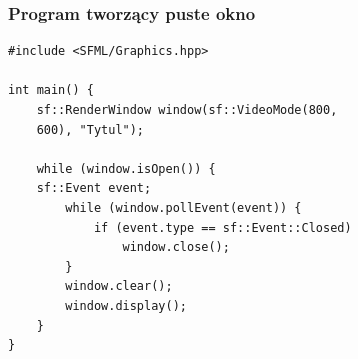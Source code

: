 \documentclass[12pt]{beamer}
\begin{document}
    \begin{frame}[fragile]
        \frametitle{Program tworzący puste okno}
        \begin{lstlisting}         
#include <SFML/Graphics.hpp>
 
int main() {
    sf::RenderWindow window(sf::VideoMode(800, 
    600), "Tytul");

    while (window.isOpen()) {
    sf::Event event;
        while (window.pollEvent(event)) {
            if (event.type == sf::Event::Closed)
                window.close();
        }       
        window.clear();       
        window.display();
    }
}

        \end{lstlisting}
    \end{frame}
    
\end{document}
